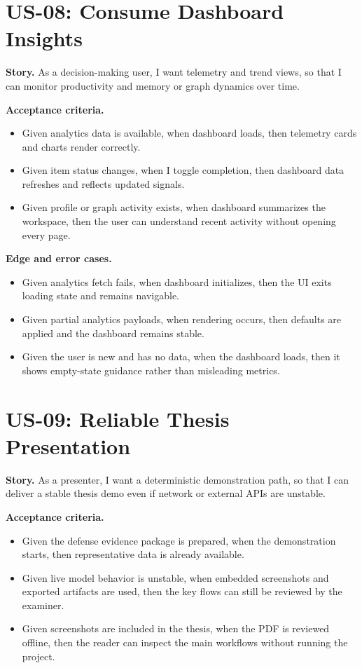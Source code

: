 \section{US-08: Consume Dashboard Insights}

\textbf{Story.} As a decision-making user, I want telemetry and trend views, so that I can monitor productivity and memory or graph dynamics over time.

\textbf{Acceptance criteria.}
\begin{itemize}
  \item Given analytics data is available, when dashboard loads, then telemetry cards and charts render correctly.
  \item Given item status changes, when I toggle completion, then dashboard data refreshes and reflects updated signals.
  \item Given profile or graph activity exists, when dashboard summarizes the workspace, then the user can understand recent activity without opening every page.
\end{itemize}

\textbf{Edge and error cases.}
\begin{itemize}
  \item Given analytics fetch fails, when dashboard initializes, then the UI exits loading state and remains navigable.
  \item Given partial analytics payloads, when rendering occurs, then defaults are applied and the dashboard remains stable.
  \item Given the user is new and has no data, when the dashboard loads, then it shows empty-state guidance rather than misleading metrics.
\end{itemize}

\section{US-09: Reliable Thesis Presentation}

\textbf{Story.} As a presenter, I want a deterministic demonstration path, so that I can deliver a stable thesis demo even if network or external APIs are unstable.

\textbf{Acceptance criteria.}
\begin{itemize}
  \item Given the defense evidence package is prepared, when the demonstration starts, then representative data is already available.
  \item Given live model behavior is unstable, when embedded screenshots and exported artifacts are used, then the key flows can still be reviewed by the examiner.
  \item Given screenshots are included in the thesis, when the PDF is reviewed offline, then the reader can inspect the main workflows without running the project.
\end{itemize}

